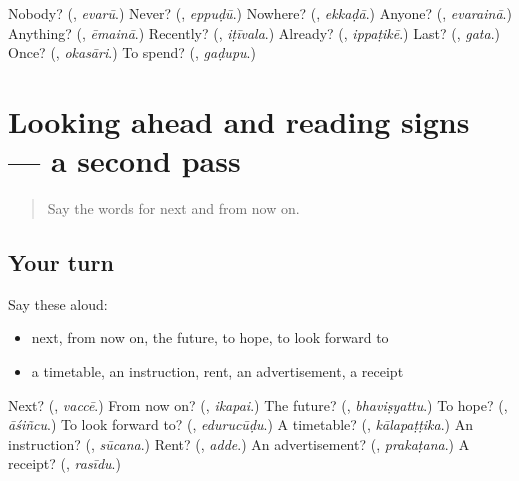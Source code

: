 \begin{tcolorbox}[breakable,colback=teal!4,colframe=teal!35!black,title={Before you move on}]
Nobody? (\textbf{}, \emph{evarū}.) Never? (\textbf{}, \emph{eppuḍū}.) Nowhere? (\textbf{}, \emph{ekkaḍā}.) Anyone? (\textbf{}, \emph{evarainā}.) Anything? (\textbf{}, \emph{ēmainā}.) Recently? (\textbf{}, \emph{iṭīvala}.) Already? (\textbf{}, \emph{ippaṭikē}.) Last? (\textbf{}, \emph{gata}.) Once? (\textbf{}, \emph{okasāri}.) To spend? (\textbf{}, \emph{gaḍupu}.)
\end{tcolorbox}
\section[(dialogue)]{Looking ahead and reading signs — a second pass}

\label{lesson:TE-R156-second-pass-looking-ahead-and-reading-signs}



\begin{quote}
Say the words for next and from now on.
\end{quote}

\subsection*{Your turn}
Say these aloud:

\begin{itemize}
\raggedright
  \item next, from now on, the future, to hope, to look forward to
  \item a timetable, an instruction, rent, an advertisement, a receipt
\end{itemize}

\begin{tcolorbox}[breakable,colback=teal!4,colframe=teal!35!black,title={Before you move on}]
Next? (\textbf{}, \emph{vaccē}.) From now on? (\textbf{}, \emph{ikapai}.) The future? (\textbf{}, \emph{bhaviṣyattu}.) To hope? (\textbf{}, \emph{āśiñcu}.) To look forward to? (\textbf{}, \emph{edurucūḍu}.) A timetable? (\textbf{}, \emph{kālapaṭṭika}.) An instruction? (\textbf{}, \emph{sūcana}.) Rent? (\textbf{}, \emph{adde}.) An advertisement? (\textbf{}, \emph{prakaṭana}.) A receipt? (\textbf{}, \emph{rasīdu}.)
\end{tcolorbox}
